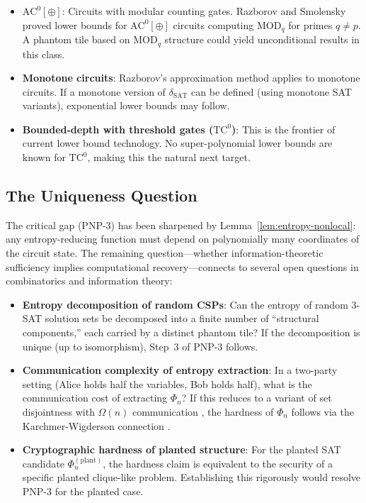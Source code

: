 \documentclass[11pt]{article}
\theoremstyle{definition}
\theoremstyle{remark}
\newcommand{\ACz}{\mathrm{AC}^0}
\newcommand{\TCz}{\mathrm{TC}^0}
\newcommand{\dSAT}{\delta_{\mathrm{SAT}}}
\begin{document}
\begin{itemize}
  \item \textbf{$\ACz[\oplus]$}: Circuits with modular counting gates.
    Razborov \cite{Raz87} and Smolensky \cite{Smol87} proved lower bounds
    for $\ACz[\oplus]$ circuits computing $\mathrm{MOD}_q$ for primes
    $q \neq p$.  A phantom tile based on $\mathrm{MOD}_q$ structure could
    yield unconditional results in this class.

  \item \textbf{Monotone circuits}: Razborov's approximation method
    \cite{Raz} applies to monotone circuits.  If a monotone version of
    $\dSAT$ can be defined (using monotone SAT variants), exponential
    lower bounds may follow.

  \item \textbf{Bounded-depth with threshold gates ($\TCz$)}: This is the
    frontier of current lower bound technology.  No super-polynomial lower
    bounds are known for $\TCz$, making this the natural next target.
\end{itemize}

\subsection{The Uniqueness Question}

The critical gap (PNP-3) has been sharpened by
Lemma~\ref{lem:entropy-nonlocal}: any entropy-reducing function must depend
on polynomially many coordinates of the circuit state.  The remaining
question---whether information-theoretic sufficiency implies computational
recovery---connects to several open questions in combinatorics and
information theory:

\begin{itemize}
  \item \textbf{Entropy decomposition of random CSPs}: Can the entropy of
    random 3-SAT solution sets be decomposed into a finite number of
    ``structural components,'' each carried by a distinct phantom tile?
    If the decomposition is unique (up to isomorphism), Step~3 of PNP-3
    follows.

  \item \textbf{Communication complexity of entropy extraction}: In a
    two-party setting (Alice holds half the variables, Bob holds half),
    what is the communication cost of extracting $\Phi_n$?  If this reduces
    to a variant of set disjointness with $\Omega(n)$ communication
    \cite{Raz2}, the hardness of $\Phi_n$ follows via the Karchmer-Wigderson
    connection \cite{KW}.

  \item \textbf{Cryptographic hardness of planted structure}: For the planted
    SAT candidate $\Phi_n^{(\mathrm{plant})}$, the hardness claim is
    equivalent to the security of a specific planted clique-like problem.
    Establishing this rigorously would resolve PNP-3 for the planted case.
\end{itemize}
\end{document}
